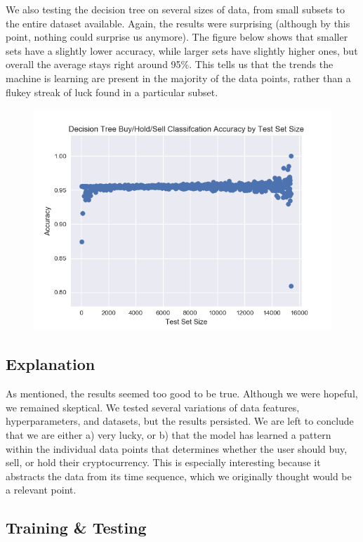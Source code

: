 \documentclass{article}
\begin{document}
We also testing the decision tree on several sizes of data, from small subsets to the entire dataset available. Again, the results were surprising (although by this point, nothing could surprise us anymore). The figure below shows that smaller sets have a slightly lower accuracy, while larger sets have slightly higher ones, but overall the average stays right around 95\%. This tells us that the trends the machine is learning are present in the majority of the data points, rather than a flukey streak of luck found in a particular subset.

\begin{figure}
	\includegraphics[scale=0.55 ]{../pic/size.png}
\end{figure}

\subsection{ Explanation }

As mentioned, the results seemed too good to be true. Although we were hopeful, we remained skeptical. We tested several variations of data features, hyperparameters, and datasets, but the results persisted. We are left to conclude that we are either a) very lucky, or b) that the model has learned a pattern within the individual data points that determines whether the user should buy, sell, or hold their cryptocurrency. This is especially interesting because it abstracts the data from its time sequence, which we originally thought would be a relevant point.

\subsection{ Training \& Testing }
\end{document}
